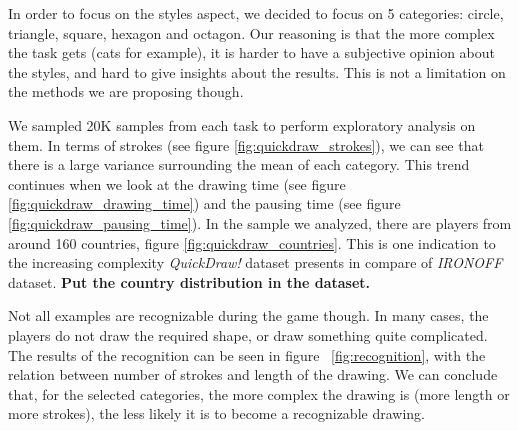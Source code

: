 \par In order to focus on the styles aspect, we decided to focus on 5 categories: circle, triangle, square, hexagon and octagon. Our reasoning is that the more complex the task gets (cats for example), it is harder to have a subjective opinion about the styles, and hard to give insights about the results. This is not a limitation on the methods we are proposing though.

\par We sampled 20K samples from each task to perform exploratory analysis on them. In terms of strokes (see figure \ref{fig:quickdraw_strokes}), we can see that there is a large variance surrounding the mean of each category. This trend continues when we look at the drawing time (see figure \ref{fig:quickdraw_drawing_time}) and the pausing time (see figure \ref{fig:quickdraw_pausing_time}). In the sample we analyzed, there are players from around 160 countries, figure \ref{fig:quickdraw_countries}. This is one indication to the increasing complexity \textit{QuickDraw!} dataset presents in compare of \textit{IRONOFF} dataset. \textbf{Put the country distribution in the dataset.}

\par Not all examples are recognizable during the game though. In many cases, the players do not draw the required shape, or draw something quite complicated. The results of the recognition can be seen in figure ~\ref{fig:recognition}, with the relation between number of strokes and length of the drawing. We can conclude that, for the selected categories, the more complex the drawing is (more length or more strokes), the less likely it is to become a recognizable drawing.


